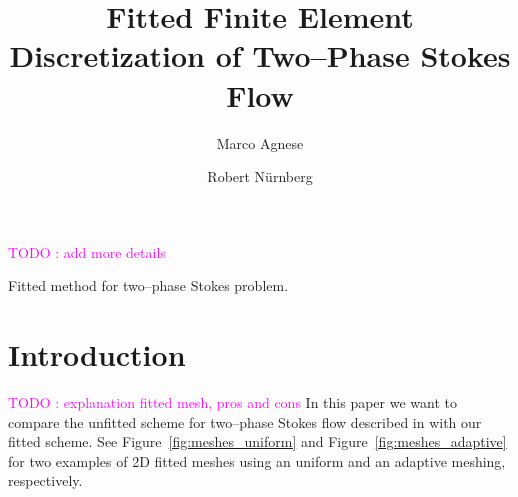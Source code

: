 \documentclass[a4paper,12pt,onecolumn]{article}
\title{Fitted Finite Element Discretization of Two--Phase Stokes Flow}
\author{Marco Agnese \and Robert N\"urnberg}
\begin{document}
\captionsetup[subfigure]{labelformat=empty} %

\maketitle

\begin{abstract}

\end{abstract}

\textcolor{magenta}{TODO : add more details}

Fitted method for two--phase Stokes problem. 

\section{Introduction}\label{sec:introduction}
\textcolor{magenta}{TODO : explanation fitted mesh, pros and cons}
In this paper we want to compare the unfitted scheme for two--phase Stokes flow described in \cite{spurious} with our fitted scheme. See Figure~\ref{fig:meshes_uniform} and Figure~\ref{fig:meshes_adaptive} for two examples of 2D fitted meshes using an uniform and an adaptive meshing, respectively.  
\end{document}
